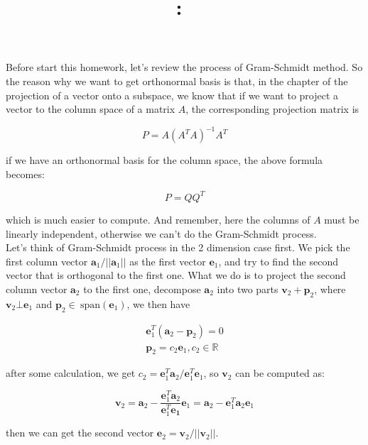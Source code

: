 \documentclass{article}
\title{
    \vspace{2in}
    \textmd{\textbf{\hmwkClass:\ \hmwkTitle}}\\
    \vspace{0.1in}\large{\textit{\hmwkClassInstructor}}
    \vspace{3in}
}
\author{\hmwkAuthorName}
\date{}
\begin{document}
\maketitle

\pagebreak

Before start this homework, let's review the process of Gram-Schmidt method.
So the reason why we want to get orthonormal basis is that, in the chapter
of the projection of a vector onto a subspace,  we know that if we want to project a vector
to the column space of a matrix \( A \), the corresponding projection matrix is

\[
    P = A{(A^T A)}^{-1} A^T
\]

if we have an orthonormal basis for the column space, the above formula becomes:

\[
    P = QQ^T
\]

which is much easier to compute. And remember, here the columns of \( A \) must be
linearly independent, otherwise we can't do the Gram-Schmidt process.
\\

Let's think of Gram-Schmidt process in the 2 dimension case first.
We pick the first column
vector \( \mathbf{a}_1 / || \mathbf{a}_1 || \) as the first vector \( \mathbf{e}_1 \), and try to find the second vector that is orthogonal
to the first one. What we do is to project the second column vector \( \mathbf{a}_2 \) to the first one,
decompose \( \mathbf{a}_2 \) into two parts \( \mathbf{v}_2 + \mathbf{p}_2 \), where
\( \mathbf{v}_2 \bot  \mathbf{e}_1 \) and \( \mathbf{p}_2 \in\ \text{span}(\mathbf{e}_1) \), we then have

\[  
    \begin{array}{ll}
        \mathbf{e}_1^T(\mathbf{a}_2 - \mathbf{p}_2) = 0 \\

        \mathbf{p}_2 = c_2 \mathbf{e}_1, c_2 \in \mathbb{R}
    \end{array}
\]

after some calculation, we get \( c_2 = \mathbf{e}_1^T \mathbf{a}_2 / \mathbf{e}_1^T\mathbf{e}_1 \), so \( \mathbf{v}_2 \) can be computed as:

\[ \mathbf{v}_2 =  \mathbf{a}_2 - \frac{\mathbf{e}_1^T \mathbf{a}_2}{\mathbf{e}_1^T \mathbf{e_1}} \mathbf{e}_1 = \mathbf{a}_2 - \mathbf{e}_1^T \mathbf{a}_2 \mathbf{e}_1
\]

then we can get the second vector \( \mathbf{e}_2 = \mathbf{v}_2 / || \mathbf{v}_2 || \).
\\
\end{document}
